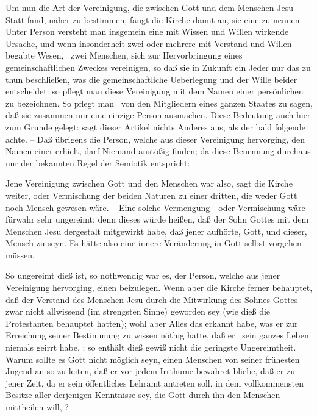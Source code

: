 \begin{aufza}
\item Um nun die Art der Vereinigung, die zwischen Gott und dem Menschen Jesu Statt fand, näher zu bestimmen, fängt die Kirche damit an, sie eine  zu nennen. Unter Person versteht man insgemein eine mit Wissen und Willen wirkende Ursache, und wenn insonderheit zwei oder mehrere mit Verstand und Willen begabte Wesen, \zB\ zwei Menschen, sich zur Hervorbringung eines gemeinschaftlichen Zweckes vereinigen, so daß sie in Zukunft ein Jeder nur das zu thun beschließen, was die gemeinschaftliche Ueberlegung und der Wille beider entscheidet: so pflegt man diese Vereinigung mit dem Namen einer persönlichen zu bezeichnen. So pflegt man \zB\ von den Mitgliedern eines ganzen Staates zu sagen, daß sie zusammen nur eine einzige Person ausmachen. Diese Bedeutung auch hier zum Grunde gelegt: sagt dieser Artikel nichts Anderes aus, als der bald folgende achte. -- Daß übrigens die Person, welche aus dieser Vereinigung hervorging, den Namen einer  erhielt, darf Niemand anstößig finden; da diese Benennung durchaus nur der bekannten Regel der Semiotik entspricht: 
\item Jene Vereinigung zwischen Gott und den Menschen war also, sagt die Kirche weiter,  oder Vermischung der beiden Naturen zu einer dritten, die weder Gott noch Mensch gewesen wäre. -- Eine solche Vermengung~\ oder Vermischung wäre fürwahr sehr ungereimt; denn dieses würde heißen, daß der Sohn Gottes mit dem Menschen Jesu dergestalt mitgewirkt habe, daß jener aufhörte, Gott, und dieser, Mensch zu seyn. Es hätte also eine innere Veränderung in Gott selbst vorgehen müssen.
\item So ungereimt dieß ist, so nothwendig war es, der Person, welche aus jener Vereinigung hervorging, einen  beizulegen. Wenn aber die Kirche ferner behauptet, daß der Verstand des Menschen Jesu durch die Mitwirkung des Sohnes Gottes zwar nicht allwissend (im strengsten Sinne) geworden sey (wie dieß die Protestanten behauptet hatten); wohl aber Alles das erkannt habe, was er zur Erreichung seiner Bestimmung zu wissen nöthig hatte, daß er \zB\ sein ganzes Leben niemals geirrt habe, \udgl : so enthält dieß gewiß nicht die geringste Ungereimtheit. Warum sollte es Gott nicht möglich seyn, einen Menschen von seiner frühesten Jugend an so zu leiten, daß er vor jedem Irrthume bewahret bliebe, daß er zu jener Zeit, da er sein öffentliches Lehramt antreten soll, in dem vollkommensten Besitze aller derjenigen Kenntnisse sey, die Gott durch ihn den Menschen mittheilen will, \usw ?\par

\end{aufza}
